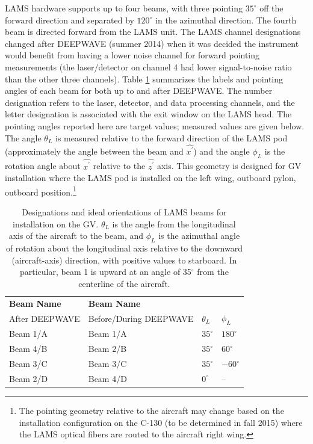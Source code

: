\documentclass[12pt,twoside,english]{article}\usepackage[]{graphicx}\usepackage[]{color}
\providecommand{\tabularnewline}{\\}
\let\OrgIndex\index
\renewcommand*{\index}[1]{\OrgIndex{#1}}
\begin{document}
{{LAMS hardware supports up to four  beams, with three pointing $35^{\circ}$ off the forward direction and separated by $120^{\circ}$ in the azimuthal direction. The fourth beam is directed forward from the LAMS unit. The LAMS channel designations changed after DEEPWAVE (summer 2014) when it was decided the instrument would benefit from having a lower noise channel for forward pointing measurements (the laser/detector on channel 4 had lower signal-to-noise ratio than the other three channels). Table \ref{tab:BeamConfig} summarizes the labels and pointing angles of each beam for both up to and after DEEPWAVE. The number designation refers to the laser, detector, and data processing channels, and the letter designation is associated with the exit window on the LAMS head. The pointing angles reported here are target values; measured values are given below. The angle $\theta_L$ is measured relative to the forward direction of the LAMS pod (approximately the angle between the beam and $\hat{x^{\prime}}$) and the angle $\phi_L$ is the rotation angle about $\hat{x^{\prime}}$ relative to the $\hat{z^{\prime}}$ axis. This geometry is designed for GV installation where the LAMS pod is installed on the left wing, outboard pylon, outboard position.\footnote{The pointing geometry relative to the aircraft may change based on the installation configuration on the C-130 (to be determined in fall 2015) where the LAMS optical fibers are routed to the aircraft right wing.}

\begin{table}
\begin{minipage}[t]{0.93\columnwidth}%
\begin{center}
\begin{tabular}{>{\centering}p{3.5cm}>{\centering}p{3.5cm}>{\centering}p{2.5cm}>{\centering}p{2.5cm}}
\toprule 
\textbf{Beam Name} &
\textbf{Beam Name} &
 &
\tabularnewline
After DEEPWAVE &
Before/During DEEPWAVE &
\textbf{$\theta_{L}$}  &
\textbf{$\phi_{L}$} \tabularnewline
\midrule 
Beam 1/A  &
Beam 1/A  &
$35^{\circ}$  &
$180^{\circ}$ \tabularnewline
\midrule 
Beam 4/B  &
Beam 2/B  &
$35^{\circ}$  &
$60^{\circ}$ \tabularnewline
\midrule 
Beam 3/C  &
Beam 3/C  &
$35^{\circ}$  &
$-60^{\circ}$ \tabularnewline
\midrule 
Beam 2/D  &
Beam 4/D  &
$0^{\circ}$  &
-- \tabularnewline
\bottomrule
\end{tabular}
\par\end{center}%
\end{minipage}
\protect\caption[Designations and ideal orientations of LAMS beams for installation on the GV.]{Designations and ideal orientations of LAMS beams for installation
on the GV. $\theta_{L}$ is the angle from the longitudinal axis of
the aircraft to the beam, and $\phi_{L}$ is the azimuthal angle of
rotation about the longitudinal axis relative to the downward (aircraft-axis)
direction, with positive values to starboard. In particular, beam
1 is upward at an angle of 35$^{\circ}$ from the centerline of the
aircraft.\label{tab:BeamConfig}}
\end{table}

}}
\end{document}

